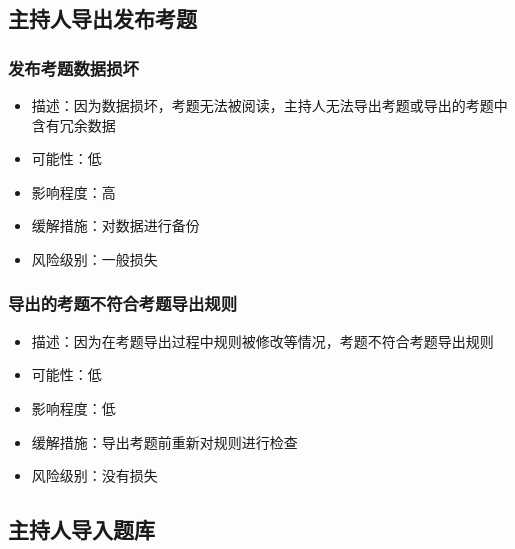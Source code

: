 \documentclass[hyperref, a4paper]{ctexart}
\providecommand{\tightlist}{%
  \setlength{\itemsep}{0pt}\setlength{\parskip}{0pt}}
\begin{document}
\hypertarget{ux4e3bux6301ux4ebaux5bfcux51faux53d1ux5e03ux8003ux9898-1}{%
\subsection{主持人导出发布考题}\label{ux4e3bux6301ux4ebaux5bfcux51faux53d1ux5e03ux8003ux9898-1}}

\hypertarget{ux53d1ux5e03ux8003ux9898ux6570ux636eux635fux574f}{%
\subsubsection{发布考题数据损坏}\label{ux53d1ux5e03ux8003ux9898ux6570ux636eux635fux574f}}

\begin{itemize}
\tightlist
\item
  描述：因为数据损坏，考题无法被阅读，主持人无法导出考题或导出的考题中含有冗余数据
\item
  可能性：低
\item
  影响程度：高
\item
  缓解措施：对数据进行备份
\item
  风险级别：一般损失
\end{itemize}

\hypertarget{ux5bfcux51faux7684ux8003ux9898ux4e0dux7b26ux5408ux8003ux9898ux5bfcux51faux89c4ux5219}{%
\subsubsection{导出的考题不符合考题导出规则}\label{ux5bfcux51faux7684ux8003ux9898ux4e0dux7b26ux5408ux8003ux9898ux5bfcux51faux89c4ux5219}}

\begin{itemize}
\tightlist
\item
  描述：因为在考题导出过程中规则被修改等情况，考题不符合考题导出规则
\item
  可能性：低
\item
  影响程度：低
\item
  缓解措施：导出考题前重新对规则进行检查
\item
  风险级别：没有损失
\end{itemize}

\hypertarget{ux4e3bux6301ux4ebaux5bfcux5165ux9898ux5e93-1}{%
\subsection{主持人导入题库}\label{ux4e3bux6301ux4ebaux5bfcux5165ux9898ux5e93-1}}
\end{document}
